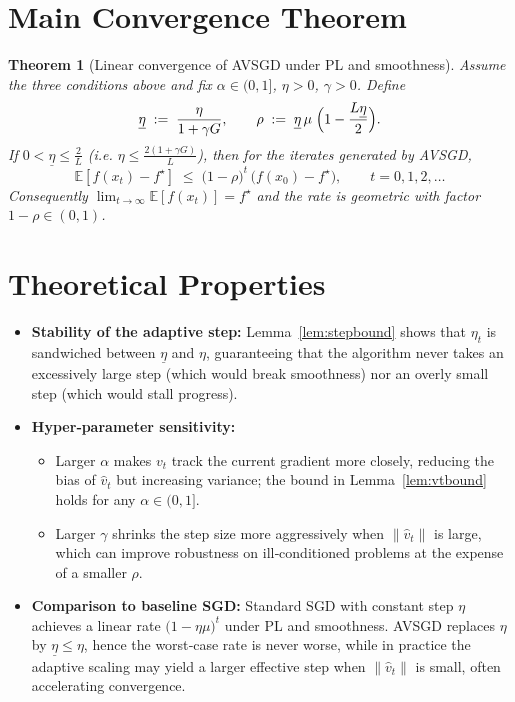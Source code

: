 \documentclass{article}
\newtheorem{theorem}{Theorem}
\newcommand{\norm}[1]{\left\lVert #1 \right\rVert}
\begin{document}
\section*{Main Convergence Theorem}
\begin{theorem}[Linear convergence of AVSGD under PL and smoothness]\label{thm:linear}
Assume the three conditions above and fix $\alpha\in(0,1]$, $\eta>0$, $\gamma>0$.
Define
\[
\underline{\eta}\;:=\;\frac{\eta}{1+\gamma G}, \qquad
\rho\;:=\;\underline{\eta}\,\mu\;\Bigl(1-\frac{L\underline{\eta}}{2}\Bigr).
\]
If $0<\underline{\eta}\le \frac{2}{L}$ (i.e. $\eta\le\frac{2(1+\gamma G)}{L}$), then for the iterates generated by AVSGD,
\[
\mathbb{E}\!\left[f(x_{t})-f^{\star}\right]\;\le\;
\bigl(1-\rho\bigr)^{t}\,\bigl(f(x_{0})-f^{\star}\bigr),\qquad t=0,1,2,\dots
\]
Consequently $\displaystyle\lim_{t\to\infty}\mathbb{E}[f(x_{t})]=f^{\star}$ and the rate is geometric with factor $1-\rho\in(0,1)$.
\end{theorem}

\section*{Theoretical Properties}
\begin{itemize}
    \item \textbf{Stability of the adaptive step:} Lemma~\ref{lem:stepbound} shows that $\eta_{t}$ is sandwiched between $\underline{\eta}$ and $\eta$, guaranteeing that the algorithm never takes an excessively large step (which would break smoothness) nor an overly small step (which would stall progress).
    \item \textbf{Hyper‑parameter sensitivity:}
          \begin{itemize}
            \item Larger $\alpha$ makes $v_{t}$ track the current gradient more closely, reducing the bias of $\hat v_{t}$ but increasing variance; the bound in Lemma~\ref{lem:vtbound} holds for any $\alpha\in(0,1]$.
            \item Larger $\gamma$ shrinks the step size more aggressively when $\norm{\hat v_{t}}$ is large, which can improve robustness on ill‑conditioned problems at the expense of a smaller $\rho$.
          \end{itemize}
    \item \textbf{Comparison to baseline SGD:} Standard SGD with constant step $\eta$ achieves a linear rate $\bigl(1-\eta\mu\bigr)^{t}$ under PL and smoothness. AVSGD replaces $\eta$ by $\underline{\eta}\le\eta$, hence the worst‑case rate is never worse, while in practice the adaptive scaling may yield a larger effective step when $\norm{\hat v_{t}}$ is small, often accelerating convergence.
\end{itemize}
\end{document}
